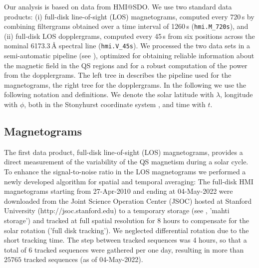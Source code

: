 \documentclass{aa}
\begin{document}
Our analysis is based on data from HMI@SDO. We use two standard data products: (i) full-disk line-of-sight (LOS) magnetograms, computed every 720\,s by combining filtergrams obtained over a time interval of 1260\,s (\texttt{hmi.M\_720s}), and (ii) full-disk LOS dopplergrams, computed every 45\,s from six positions across the nominal 6173.3\,\AA{} spectral line (\texttt{hmi.V\_45s}). We processed the two data sets in a semi-automatic pipeline (see ), optimized for obtaining reliable information about the magnetic field in the QS regions and for a robust computation of the \fff power from the dopplergrams. The left tree in  describes the pipeline used for the magnetograms, the right tree for the dopplergrams.
In the following we use the following notation and definitions. 
We denote the solar 
latitude with $\lambda$, longitude with $\phi$, 
both in the Stonyhurst coordinate system \cite[]{Thomson06}, 
and time with $t$. 



\subsection{Magnetograms}

The first data product, full-disk line-of-sight (LOS) magnetograms, provides a direct measurement of the variability of the %
QS
magnetism during a solar cycle. To enhance the signal-to-noise ratio in the LOS magnetograms we performed a newly developed algorithm for spatial and temporal averaging: The full-disk HMI magnetograms starting from 27-Apr-2010 and ending at 
04-May-2022
were downloaded from the Joint Science Operation Center (JSOC) hosted at Stanford University (http://jsoc.stanford.edu) to a temporary storage (see , 'mahti storage') and tracked at full spatial resolution for 8 hours to compensate for the solar rotation ('full disk tracking').
We neglected differential rotation due to
the short tracking time.
The step between tracked sequences was 4 hours, so that a total of 6 tracked sequences were gathered per one day, resulting in more than 
$25765$ tracked sequences (as of 04-May-2022).
\end{document}
